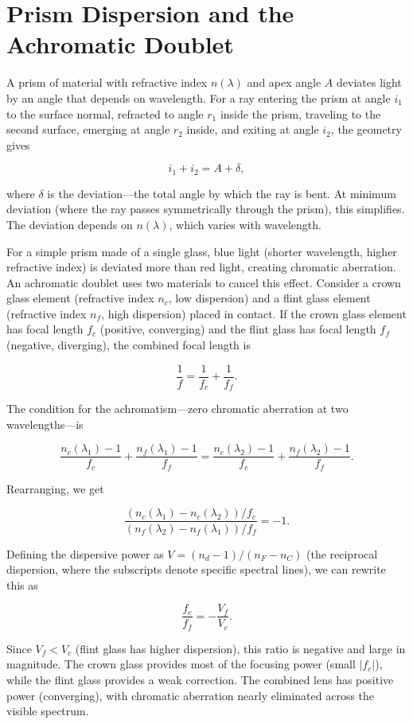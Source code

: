 \section{Prism Dispersion and the Achromatic Doublet}

A prism of material with refractive index $n(\lambda)$ and apex angle $A$ deviates light by an angle that depends on wavelength. For a ray entering the prism at angle $i_1$ to the surface normal, refracted to angle $r_1$ inside the prism, traveling to the second surface, emerging at angle $r_2$ inside, and exiting at angle $i_2$, the geometry gives

\[
  i_1 + i_2 = A + \delta,
\]

where $\delta$ is the deviation—the total angle by which the ray is bent. At minimum deviation (where the ray passes symmetrically through the prism), this simplifies. The deviation depends on $n(\lambda)$, which varies with wavelength.

For a simple prism made of a single glass, blue light (shorter wavelength, higher refractive index) is deviated more than red light, creating chromatic aberration. An achromatic doublet uses two materials to cancel this effect. Consider a crown glass element (refractive index $n_c$, low dispersion) and a flint glass element (refractive index $n_f$, high dispersion) placed in contact. If the crown glass element has focal length $f_c$ (positive, converging) and the flint glass has focal length $f_f$ (negative, diverging), the combined focal length is

\[
  \frac{1}{f} = \frac{1}{f_c} + \frac{1}{f_f}.
\]

The condition for the achromatism—zero chromatic aberration at two wavelengths—is

\[
  \frac{n_c(\lambda_1) - 1}{f_c} + \frac{n_f(\lambda_1) - 1}{f_f} = \frac{n_c(\lambda_2) - 1}{f_c} + \frac{n_f(\lambda_2) - 1}{f_f}.
\]

Rearranging, we get

\[
  \frac{(n_c(\lambda_1) - n_c(\lambda_2))/f_c}{(n_f(\lambda_2) - n_f(\lambda_1))/f_f} = -1.
\]

Defining the dispersive power as $V = (n_d - 1)/(n_F - n_C)$ (the reciprocal dispersion, where the subscripts denote specific spectral lines), we can rewrite this as

\[
  \frac{f_c}{f_f} = -\frac{V_f}{V_c}.
\]

Since $V_f < V_c$ (flint glass has higher dispersion), this ratio is negative and large in magnitude. The crown glass provides most of the focusing power (small $|f_c|$), while the flint glass provides a weak correction. The combined lens has positive power (converging), with chromatic aberration nearly eliminated across the visible spectrum.

